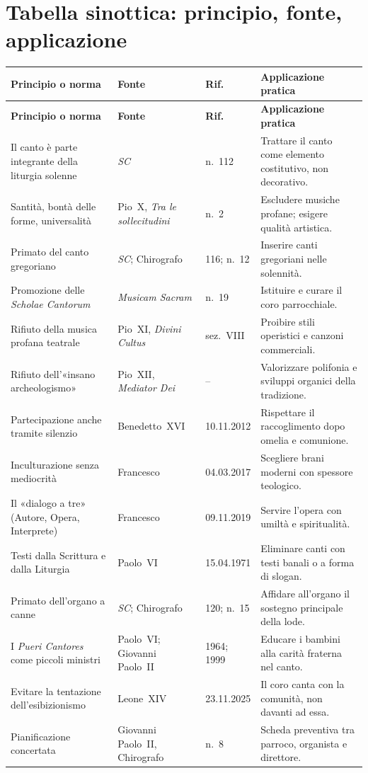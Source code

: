 \documentclass[12pt,a4paper]{article}
\begin{document}
	\section{Tabella sinottica: principio, fonte, applicazione}
	
	\begin{longtable}{L{3.9cm}L{3.2cm}L{2.0cm}L{4.3cm}}
		\toprule
		\textbf{Principio o norma} & \textbf{Fonte} & \textbf{Rif.} & \textbf{Applicazione pratica} \\
		\midrule
		\endfirsthead
		\toprule
		\textbf{Principio o norma} & \textbf{Fonte} & \textbf{Rif.} & \textbf{Applicazione pratica} \\
		\midrule
		\endhead
		\bottomrule
		\endlastfoot
		Il canto è parte integrante della liturgia solenne &
		\emph{SC} & n.~112 &
		Trattare il canto come elemento costitutivo, non decorativo. \\
		Santità, bontà delle forme, universalità &
		Pio~X, \emph{Tra le sollecitudini} & n.~2 &
		Escludere musiche profane; esigere qualità artistica. \\
		Primato del canto gregoriano &
		\emph{SC}; Chirografo & 116; n.~12 &
		Inserire canti gregoriani nelle solennità. \\
		Promozione delle \emph{Scholae Cantorum} &
		\emph{Musicam Sacram} & n.~19 &
		Istituire e curare il coro parrocchiale. \\
		Rifiuto della musica profana teatrale &
		Pio~XI, \emph{Divini Cultus} & sez.~VIII &
		Proibire stili operistici e canzoni commerciali. \\
		Rifiuto dell'«insano archeologismo» &
		Pio~XII, \emph{Mediator Dei} & -- &
		Valorizzare polifonia e sviluppi organici della tradizione. \\
		Partecipazione anche tramite silenzio &
		Benedetto~XVI & 10.11.2012 &
		Rispettare il raccoglimento dopo omelia e comunione. \\
		Inculturazione senza mediocrità &
		Francesco & 04.03.2017 &
		Scegliere brani moderni con spessore teologico. \\
		Il «dialogo a tre» (Autore, Opera, Interprete) &
		Francesco & 09.11.2019 &
		Servire l'opera con umiltà e spiritualità. \\
		Testi dalla Scrittura e dalla Liturgia &
		Paolo~VI & 15.04.1971 &
		Eliminare canti con testi banali o a forma di slogan. \\
		Primato dell'organo a canne &
		\emph{SC}; Chirografo & 120; n.~15 &
		Affidare all'organo il sostegno principale della lode. \\
		I \emph{Pueri Cantores} come piccoli ministri &
		Paolo~VI; Giovanni Paolo~II & 1964; 1999 &
		Educare i bambini alla carità fraterna nel canto. \\
		Evitare la tentazione dell'esibizionismo &
		Leone~XIV & 23.11.2025 &
		Il coro canta con la comunità, non davanti ad essa. \\
		Pianificazione concertata &
		Giovanni Paolo~II, Chirografo & n.~8 &
		Scheda preventiva tra parroco, organista e direttore. \\
	\end{longtable}
	
\end{document}
